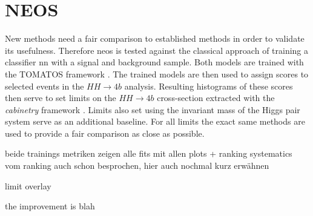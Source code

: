 \chapter{NEOS}
New methods need a fair comparison to established methods in order to validate its usefulness. Therefore \ac{neos} is tested against the classical approach of training a classifier \ac{nn} with a signal and background sample. Both models are trained with the TOMATOS framework \citep{tomatos}. The trained models are then used to assign scores to selected events in the $HH\rightarrow4b$ analysis. Resulting histograms of these scores then serve to set limits on the $HH\rightarrow4b$ cross-section extracted with the \textit{cabinetry} framework \citep{cranmer_2021_4627038}. Limits also set using the invariant mass of the Higgs pair system serve as an additional baseline. For all limits the exact same methods are used to provide a fair comparison as close as possible.

beide trainings metriken zeigen
alle fits mit allen plots + ranking
systematics vom ranking auch schon besprochen, hier auch nochmal kurz erwähnen 

limit overlay 

the improvement is blah 




